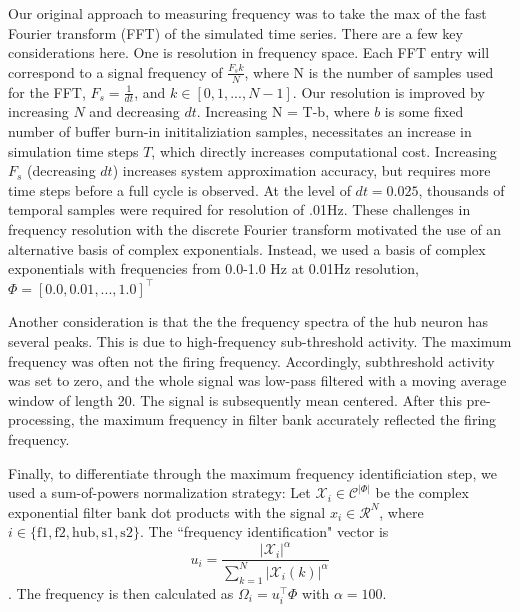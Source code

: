 \documentclass[11pt]{article}
\begin{document}
Our original approach to measuring frequency was to take the max of the fast Fourier transform (FFT) of the simulated time series.  There are a few key considerations here.  One is resolution in frequency space.  Each FFT entry will correspond to a signal frequency of $\frac{F_s k}{N}$, where N is the number of samples used for the FFT, $F_s = \frac{1}{dt}$, and $k \in \left[0, 1, ..., N-1\right]$.  Our resolution is improved by increasing $N$ and decreasing $dt$.  Increasing N = T-b, where $b$ is some fixed number of buffer burn-in inititaliziation samples, necessitates an increase in simulation time steps $T$, which directly increases computational cost.  Increasing $F_s$ (decreasing $dt$) increases system approximation accuracy, but requires more time steps before a full cycle is observed.  At the level of $dt = 0.025$, thousands of temporal samples were required for resolution of .01Hz.  These challenges in frequency resolution with the discrete Fourier transform motivated the use of an alternative basis of complex exponentials.  Instead, we used a basis of complex exponentials with frequencies from 0.0-1.0 Hz at 0.01Hz resolution, $\Phi = \left[ 0.0, 0.01, ..., 1.0 \right]^\top$

Another consideration is that the the frequency spectra of the hub neuron has several peaks.  This is due to high-frequency sub-threshold activity. The maximum frequency was often not the firing frequency.  Accordingly, subthreshold activity was set to zero, and the whole signal was low-pass filtered with a moving average window of length 20.  The signal is subsequently mean centered.  After this pre-processing, the maximum frequency in filter bank accurately reflected the firing frequency.

Finally, to differentiate through the maximum frequency identificiation step, we used a sum-of-powers normalization strategy: Let $\mathcal{X}_i \in \mathcal{C}^{|\Phi|}$ be the complex exponential filter bank dot products with the signal $x_i \in \mathcal{R}^{N}$, where $i \in \{ \text{f1}, \text{f2}, \text{hub}, \text{s1}, \text{s2} \}$.  The ``frequency identification" vector is \[u_i = \frac{|\mathcal{X}_i|^\alpha}{\sum_{k=1}^N |\mathcal{X}_i(k)|^\alpha} \].  The frequency is then calculated as $\Omega_i = u_i^\top \Phi$ with $\alpha = 100$.
\end{document}
